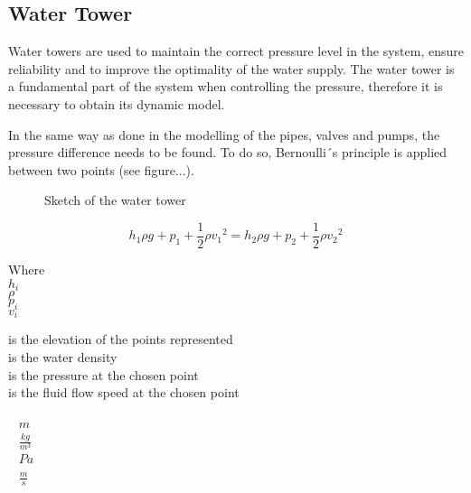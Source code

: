 \subsection{Water Tower} 
\label{WaterTankModel}

Water towers are used to maintain the correct pressure level in the system, ensure reliability and to improve the optimality of the water supply. The water tower is a fundamental part of the system when controlling the pressure, therefore it is 
necessary to obtain its dynamic model. 

In the same way as done in the modelling of the pipes, valves and pumps, the pressure difference needs to be found. 
To do so, Bernoulli´s principle is applied between two points (see figure...).


\begin{figure}[H]
\centering
 
\caption{Sketch of the water tower}
\label{fig:watertower_sketch}
\end{figure}


\begin{equation}
  \label{bernoulli}
  h_1\rho g + p_1 + \frac{1}{2}\rho {v_1}^2 = h_2\rho g + p_2 + \frac{1}{2}\rho {v_2}^2
\end{equation}

\begin{minipage}[t]{0.20\textwidth}
Where\\
\hspace*{8mm} $h_i$ \\
\hspace*{8mm} $\rho$ \\
\hspace*{8mm} $p_i$ \\
\hspace*{8mm} $v_i$ \\

\end{minipage}
\begin{minipage}[t]{0.68\textwidth}
\vspace*{2mm}
is the elevation of the points represented\\
is the water density\\
is the pressure at the chosen point\\
is the fluid flow speed at the chosen point
\end{minipage}
\begin{minipage}[t]{0.10\textwidth}
\vspace*{2mm}
\textcolor{White}{te}$\unit{m}$\\
\textcolor{White}{te}$\unit{\frac{kg}{m^3}}$\\
\textcolor{White}{te}$\unit{Pa}$\\
\textcolor{White}{te}$\unit{\frac{m}{s}}$
\end{minipage}

